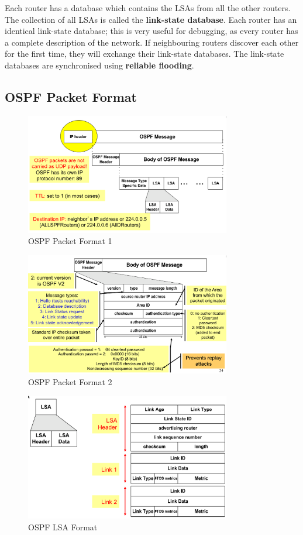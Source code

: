 \documentclass[a4paper,11pt]{article}
\begin{document}
Each router has a database which contains the LSAs from all the other routers.
The collection of all LSAs is called the \textbf{link-state database}. 
Each router has an identical link-state database; this is very useful for debugging, as every router has a complete 
description of the network.
If neighbouring routers discover each other for the first time, they will exchange their link-state databases.
The link-state databases are synchronised using \textbf{reliable flooding}.

\subsection{OSPF Packet Format}
\begin{figure}[H]
    \centering
    \includegraphics[width=0.8\textwidth]{./images/ospf_packet_format.png}
    \caption{OSPF Packet Format 1}
\end{figure}
\begin{figure}[H]
    \centering
    \includegraphics[width=0.8\textwidth]{./images/ospf_packet_format2.png}
    \caption{OSPF Packet Format 2}
\end{figure}
\begin{figure}[H]
    \centering
    \includegraphics[width=0.8\textwidth]{./images/ospf_lsa_format.png}
    \caption{OSPF LSA Format}
\end{figure}
\end{document}
